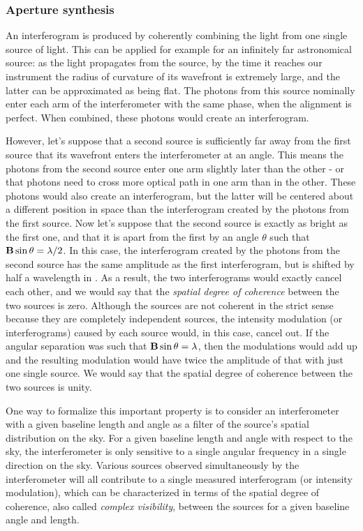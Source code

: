 \subsubsection{Aperture synthesis}

An interferogram is produced by coherently combining the light from one single source of light. This can be applied for example for an infinitely far astronomical source: as the light propagates from the source, by the time it reaches our instrument the radius of curvature of its wavefront is extremely large, and the latter can be approximated as being flat. The photons from this source nominally enter each arm of the interferometer with the same phase, when the alignment is perfect. When combined, these photons would create an interferogram.

However, let's suppose that a second source is sufficiently far away from the first source that its wavefront enters the interferometer at an angle. This means the photons from the second source enter one arm slightly later than the other - or that photons need to cross more optical path in one arm than in the other. These photons would also create an interferogram, but the latter will be centered about a different position in \OPD  space than the interferogram created by the photons from the first source. Now let's suppose that the second source is exactly as bright as the first one, and that it is apart from the first by an angle $\theta$ such that $\mathbf{B}\sin\theta = \lambda/2$. In this case,  the interferogram created by the photons from the second source has the same amplitude as the first interferogram, but is shifted by half a wavelength in \OPD. As a result, the two interferograms would exactly cancel each other, and we would say that the \textit{spatial degree of coherence} between the two sources is zero. Although the sources are not coherent in the strict sense because they are completely independent sources, the intensity modulation (or interferograms) caused by each source would, in this case, cancel out. If the angular separation was such that $\mathbf{B}\sin\theta = \lambda$, then the modulations would add up and the resulting modulation would have twice the amplitude of that with just one single source. We would say that the spatial degree of coherence between the two sources is unity. 

One way to formalize this important property is to consider an interferometer with a given baseline length and angle as a filter of the source's spatial distribution on the sky. For a given baseline length and angle with respect to the sky, the interferometer is only sensitive to a single angular frequency in a single direction on the sky. Various sources observed simultaneously by the interferometer will all contribute to a single measured interferogram (or intensity modulation), which can be characterized in terms of the spatial degree of coherence, also called \textit{complex visibility}, between the sources for a given baseline angle and length. 

